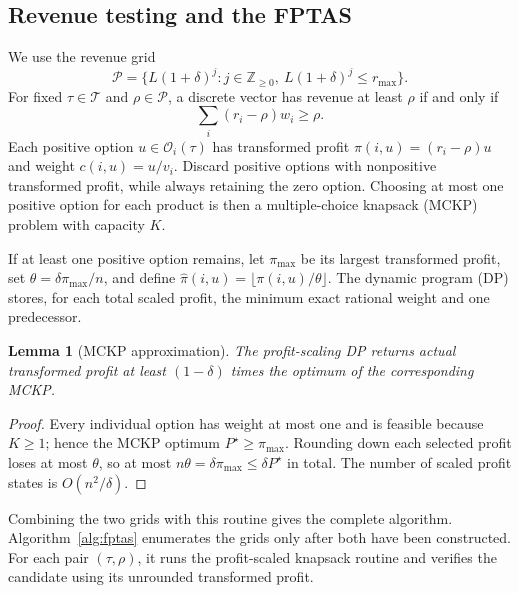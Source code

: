 \documentclass[11pt]{article}
\newtheorem{lemma}[theorem]{Lemma}
\begin{document}
\subsection{Revenue testing and the FPTAS}
We use the revenue grid
\[
 \mathcal P=\{L(1+\delta)^j:j\in\mathbb Z_{\ge0},\ L(1+\delta)^j\le r_{\max}\}.
\]
For fixed $\tau\in\mathcal T$ and $\rho\in\mathcal P$, a discrete vector has revenue at least $\rho$ if and only if
\begin{equation}
 \sum_i(r_i-\rho)w_i\ge\rho.\label{eq:test}
\end{equation}
Each positive option $u\in\mathcal O_i(\tau)$ has transformed profit $\pi(i,u)=(r_i-\rho)u$ and weight $c(i,u)=u/v_i$. Discard positive options with nonpositive transformed profit, while always retaining the zero option. Choosing at most one positive option for each product is then a multiple-choice knapsack (MCKP) problem with capacity $K$.

If at least one positive option remains, let $\pi_{\max}$ be its largest transformed profit, set $\theta=\delta\pi_{\max}/n$, and define $\widehat\pi(i,u)=\lfloor\pi(i,u)/\theta\rfloor$. The dynamic program (DP) stores, for each total scaled profit, the minimum exact rational weight and one predecessor.

\begin{lemma}[MCKP approximation]\label{lem:mckp}
The profit-scaling DP returns actual transformed profit at least $(1-\delta)$ times the optimum of the corresponding MCKP.
\end{lemma}
\begin{proof}
Every individual option has weight at most one and is feasible because $K\ge1$; hence the MCKP optimum $P^\star\ge\pi_{\max}$. Rounding down each selected profit loses at most $\theta$, so at most $n\theta=\delta\pi_{\max}\le\delta P^\star$ in total. The number of scaled profit states is $O(n^2/\delta)$.
\end{proof}

Combining the two grids with this routine gives the complete algorithm. Algorithm~\ref{alg:fptas} enumerates the grids only after both have been constructed. For each pair $(\tau,\rho)$, it runs the profit-scaled knapsack routine and verifies the candidate using its unrounded transformed profit.
\end{document}
